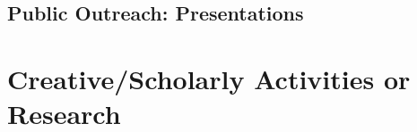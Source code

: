 \begin{comment}

\raggedright\vspace{2mm}\textbf{Activity}
\begin{itemize}
\item On-line output \cite{moore2018onlinecatalog,moore2018textitcitripestis2,moore2018textitcitripestis,moore2018lobatelac2,moore2018scanuniversity,moore2017website,moore2018insectpin,moore2018checklist,moore2018citripestis,moore2018lobatelac,manuel2017pacific,moore2018inaturalist,moore2018interactive,moore2017listof,moore2017guamforestry,moore2017crbgarticlereview,moore2017crbtrap,moore2017techblog,moore2017scaevoladieback,moore2017failedattempt,moore2017publish,moore2017usingscrapy,moore2017tweeking,moore2017install,moore2017setting,moore2017usingthe,moore2017finding,moore2017usingscrapy2,moore2017calculate,moore2017converting,moore2017migrate,moore2018croppestlist}
\end{itemize}
\raggedright\vspace{2mm}\textbf{Reference(s)}

\begin{btSect}[vancouver]{zotero}
\btPrintCited
\end{btSect}
\newpage{}
\end{comment}


\pagebreak

\subsection{Public Outreach: Presentations}
\begin{refsection}
	\nocite{*}
	\printbibliography[heading=none, keyword=Moore-presentations-after-2017]
\end{refsection} 

\pagebreak
\section{Creative/Scholarly Activities or Research}

